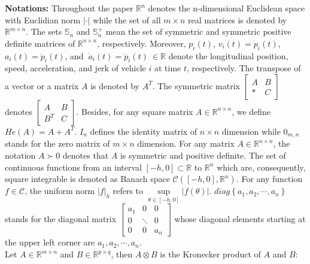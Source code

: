 \documentclass[a4paper]{cas-sc}
\begin{document}
\textbf{Notations:} Throughout the paper ${\mathbb{R}^n}$ denotes the n-dimensional Euclidean space with Euclidian norm $| \cdot |$ while the set of all $m \times n$ real matrices is denoted by ${\mathbb{R}^{m \times n}}$. The sets $ {\mathbb{S}_n} $ and $\mathbb{S}_n^ + $ mean the set of symmetric and symmetric positive definite matrices of ${\mathbb{R}^{n \times n}}$, respectively. Moreover, $p_i\left(t\right)$, $v_i\left(t\right)={\dot{p}}_i\left(t\right)$, $a_i\left(t\right)={\ddot{p}}_i\left(t\right)$, and $\ {\dot{a}}_i\left(t\right)={\dddot{p}}_i\left(t\right)\ \in\mathbb{R}$ denote the longitudinal position, speed, acceleration, and jerk of vehicle $i$ at time $t$, respectively. The transpose of a vector or a matrix $A $ is denoted by ${A^T} $. The symmetric matrix $\left[ {\begin{array}{*{20}{c}}
          A & B \\
          * & C
        \end{array}} \right]$ denotes $\left[ {\begin{array}{*{20}{c}}
          A       & B \\
          {{B^T}} & C
        \end{array}} \right]$. Besides, for any square matrix $ A \in {\mathbb{R}^{n \times n}}$, we define $ He\left( A \right) = A + {A^T}$. ${I_n} $ defines the identity matrix of $ n \times n $ dimension while ${0_{m,n}} $ stands for the zero matrix of $ m \times n$ dimension. For any matrix $A \in {\mathbb{R}^{n \times n}} $, the notation $ A \succ 0$ denotes that $A $ is symmetric and positive definite. The set of continuous functions from an interval $\left[ { - h,0} \right] \subset \mathbb{R}$ to ${\mathbb{R}^n}$ which are, consequently, square integrable is denoted as Banach space $\mathcal{C}\left( {\left[ { - h,0} \right],{\mathbb{R}^n}} \right)$. For any function $f \in \mathcal{C}$, the uniform norm $|f{|_h}$ refers to $\mathop {\sup }\limits_{\theta  \in [ - h,0]} |f(\theta )|$. $diag\left\{ {{a_1},{a_2}, \cdots ,{a_n}} \right\}$ stands for the diagonal matrix $\left[ {\begin{array}{*{20}{c}}
          {{a_1}} & 0      & 0       \\
          0       & \ddots & 0       \\
          0       & 0      & {{a_n}}
        \end{array}} \right]$ whose diagonal elements starting at the upper left corner are ${a_1},{a_2}, \cdots ,{a_n}$.\\
Let $A \in {\mathbb{R}^{m \times n}}$ and $B \in {\mathbb{R}^{p \times q}}$, then  $A \otimes B$ is the Kronecker product of $A$ and $B$:
\end{document}
